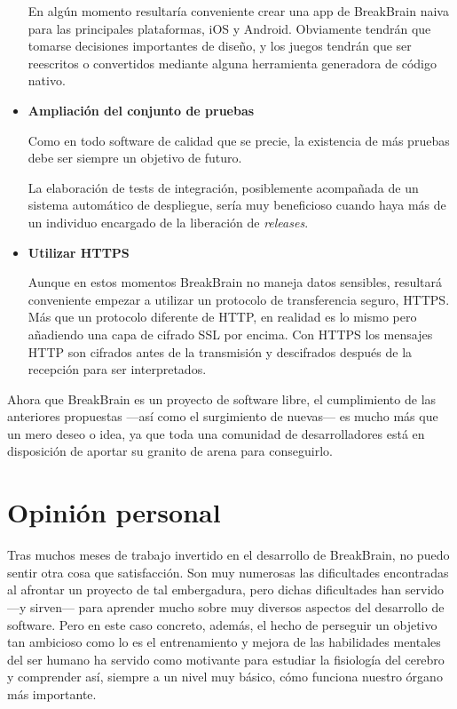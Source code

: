 \begin{itemize}
En algún momento resultaría conveniente crear una app de BreakBrain naiva para las principales plataformas, iOS y Android. Obviamente tendrán que tomarse decisiones importantes de diseño, y los juegos tendrán que ser reescritos o convertidos mediante alguna herramienta generadora de código nativo.

\item {\bf Ampliación del conjunto de pruebas}

Como en todo software de calidad que se precie, la existencia de más pruebas debe ser siempre un objetivo de futuro.

La elaboración de tests de integración, posiblemente acompañada de un sistema automático de despliegue, sería muy beneficioso cuando haya más de un individuo encargado de la liberación de {\it releases}.

\item {\bf Utilizar \acf{HTTPS}}

Aunque en estos momentos BreakBrain no maneja datos sensibles, resultará conveniente empezar a utilizar un protocolo de transferencia seguro, \acs{HTTPS}. Más que un protocolo diferente de \acs{HTTP}, en realidad es lo mismo pero añadiendo una capa de cifrado \acf{SSL} por encima. Con \acs{HTTPS} los mensajes \acs{HTTP} son cifrados antes de la transmisión y descifrados después de la recepción para ser interpretados.

\end{itemize}

Ahora que BreakBrain es un proyecto de software libre, el cumplimiento de las anteriores propuestas ---así como el surgimiento de nuevas--- es mucho más que un mero deseo o idea, ya que toda una comunidad de desarrolladores está en disposición de aportar su granito de arena para conseguirlo.

\section{Opinión personal}

Tras muchos meses de trabajo invertido en el desarrollo de BreakBrain, no puedo sentir otra cosa que satisfacción. Son muy numerosas las dificultades encontradas al afrontar un proyecto de tal embergadura, pero dichas dificultades han servido ---y sirven--- para aprender mucho sobre muy diversos aspectos del desarrollo de software. Pero en este caso concreto, además, el hecho de perseguir un objetivo tan ambicioso como lo es el entrenamiento y mejora de las habilidades mentales del ser humano ha servido como motivante para estudiar la fisiología del cerebro y comprender así, siempre a un nivel muy básico, cómo funciona nuestro órgano más importante.

